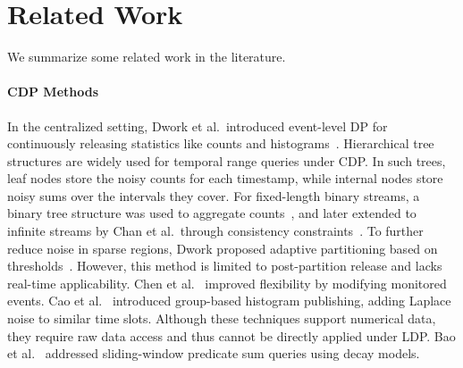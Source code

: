 \section{Related Work}
\label{sec:related}

We summarize some related work in the literature.

\paragraph{CDP Methods}
In the centralized setting, Dwork et al.~introduced event-level DP for
continuously releasing statistics like counts and histograms~\cite{Dwork2006}.
Hierarchical tree structures are widely used for temporal range queries under CDP. In such trees, leaf nodes store the noisy counts for each timestamp, while internal nodes store noisy sums over the intervals they cover.
For fixed-length binary streams, a binary tree structure was used to aggregate
counts~\cite{Dwork2010}, and later extended to infinite streams by Chan et
al.~through consistency constraints~\cite{Chan2011}.
To further reduce noise in sparse regions, Dwork proposed adaptive partitioning
based on thresholds~\cite{Dwork2015}.
However, this method is limited to post-partition release and lacks real-time
applicability.
Chen et al.~\cite{Chen2017} improved flexibility by modifying monitored events.
Cao et al.~\cite{Cao2015} introduced group-based histogram publishing, adding
Laplace noise to similar time slots.
Although these techniques support numerical data, they require raw data access
and thus cannot be directly applied under LDP.
Bao et al.~\cite{Bolot2013} addressed sliding-window predicate sum queries using
decay models.

